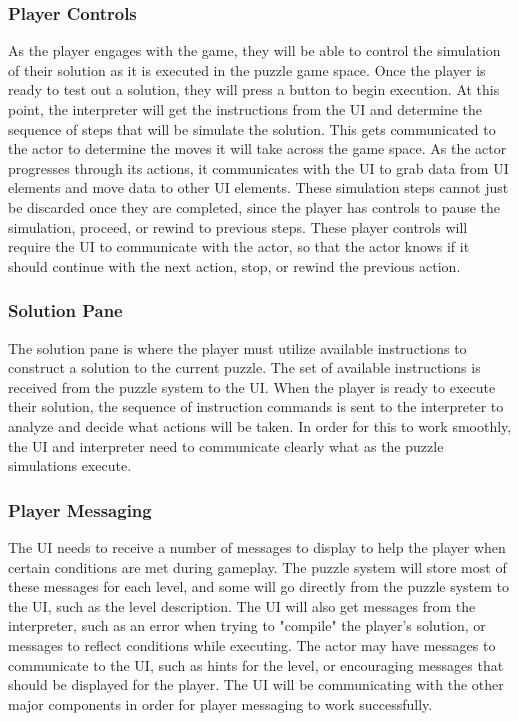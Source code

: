 \subsubsection{Player Controls}

As the player engages with the game, they will be able to control the simulation of their solution as it is executed in the puzzle game space. Once the player is ready to test out a solution, they will press a button to begin execution. At this point, the interpreter will get the instructions from the UI and determine the sequence of steps that will be simulate the solution. This gets communicated to the actor to determine the moves it will take across the game space. As the actor progresses through its actions, it communicates with the UI to grab data from UI elements and move data to other UI elements. These simulation steps cannot just be discarded once they are completed, since the player has controls to pause the simulation, proceed, or rewind to previous steps. These player controls will require the UI to communicate with the actor, so that the actor knows if it should continue with the next action, stop, or rewind the previous action.






\subsubsection{Solution Pane}

The solution pane is where the player must utilize available instructions to construct a solution to the current puzzle. The set of available instructions is received from the puzzle system to the UI. When the player is ready to execute their solution, the sequence of instruction commands is sent to the interpreter to analyze and decide what actions will be taken.
In order for this to work smoothly, the UI and interpreter need to communicate clearly what as the puzzle simulations execute.







\subsubsection{Player Messaging}

The UI needs to receive a number of messages to display to help the player when certain conditions are met during gameplay. The puzzle system will store most of these messages for each level, and some will go directly from the puzzle system to the UI, such as the level description.
The UI will also get messages from the interpreter, such as an error when trying to "compile" the player's solution, or messages to reflect conditions while executing.
The actor may have messages to communicate to the UI, such as hints for the level, or encouraging messages that should be displayed for the player.
The UI will be communicating with the other major components in order for player messaging to work successfully.



